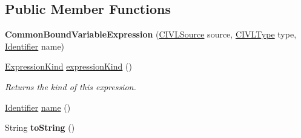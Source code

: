 \subsection*{Public Member Functions}
\begin{DoxyCompactItemize}
\item 
\hypertarget{classedu_1_1udel_1_1cis_1_1vsl_1_1civl_1_1model_1_1common_1_1expression_1_1CommonBoundVariableExpression_a9f44daf843deb69189efd06261cbae9d}{}{\bfseries Common\+Bound\+Variable\+Expression} (\hyperlink{interfaceedu_1_1udel_1_1cis_1_1vsl_1_1civl_1_1model_1_1IF_1_1CIVLSource}{C\+I\+V\+L\+Source} source, \hyperlink{interfaceedu_1_1udel_1_1cis_1_1vsl_1_1civl_1_1model_1_1IF_1_1type_1_1CIVLType}{C\+I\+V\+L\+Type} type, \hyperlink{interfaceedu_1_1udel_1_1cis_1_1vsl_1_1civl_1_1model_1_1IF_1_1Identifier}{Identifier} name)\label{classedu_1_1udel_1_1cis_1_1vsl_1_1civl_1_1model_1_1common_1_1expression_1_1CommonBoundVariableExpression_a9f44daf843deb69189efd06261cbae9d}

\item 
\hyperlink{enumedu_1_1udel_1_1cis_1_1vsl_1_1civl_1_1model_1_1IF_1_1expression_1_1Expression_1_1ExpressionKind}{Expression\+Kind} \hyperlink{classedu_1_1udel_1_1cis_1_1vsl_1_1civl_1_1model_1_1common_1_1expression_1_1CommonBoundVariableExpression_a36f511c548109cd4477d8f381672a1c9}{expression\+Kind} ()
\begin{DoxyCompactList}\small\item\em Returns the kind of this expression. \end{DoxyCompactList}\item 
\hyperlink{interfaceedu_1_1udel_1_1cis_1_1vsl_1_1civl_1_1model_1_1IF_1_1Identifier}{Identifier} \hyperlink{classedu_1_1udel_1_1cis_1_1vsl_1_1civl_1_1model_1_1common_1_1expression_1_1CommonBoundVariableExpression_a898d45e2e3ba102446b1ea5ce0ec1314}{name} ()
\item 
\hypertarget{classedu_1_1udel_1_1cis_1_1vsl_1_1civl_1_1model_1_1common_1_1expression_1_1CommonBoundVariableExpression_ad124758032d6f11ee2205eb6d59330b2}{}String {\bfseries to\+String} ()\label{classedu_1_1udel_1_1cis_1_1vsl_1_1civl_1_1model_1_1common_1_1expression_1_1CommonBoundVariableExpression_ad124758032d6f11ee2205eb6d59330b2}


\end{DoxyCompactItemize}
